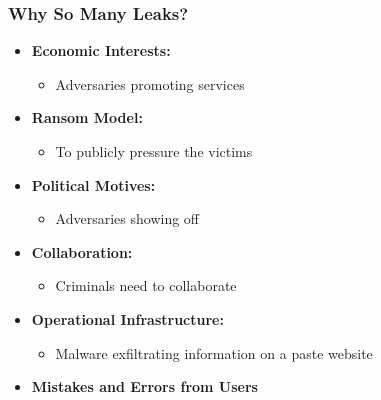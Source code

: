 \documentclass[10pt,aspectratio=169, colorlinks=true, linkcolor=circlBlue]{beamer}
\begin{document}
\begin{frame}
    \frametitle{Why So Many Leaks?}
    \begin{itemize}
        \item \textbf{Economic Interests:} 
        \begin{itemize}
            \item Adversaries promoting services
        \end{itemize}
        \item \textbf{Ransom Model:} 
        \begin{itemize}
            \item To publicly pressure the victims
        \end{itemize}
        \item \textbf{Political Motives:} 
        \begin{itemize}
            \item Adversaries showing off
        \end{itemize}
        \item \textbf{Collaboration:} 
        \begin{itemize}
            \item Criminals need to collaborate
        \end{itemize}
        \item \textbf{Operational Infrastructure:} 
        \begin{itemize}
            \item Malware exfiltrating information on a paste website
        \end{itemize}
        \item \textbf{Mistakes and Errors from Users}
    \end{itemize}
\end{frame}
\end{document}
